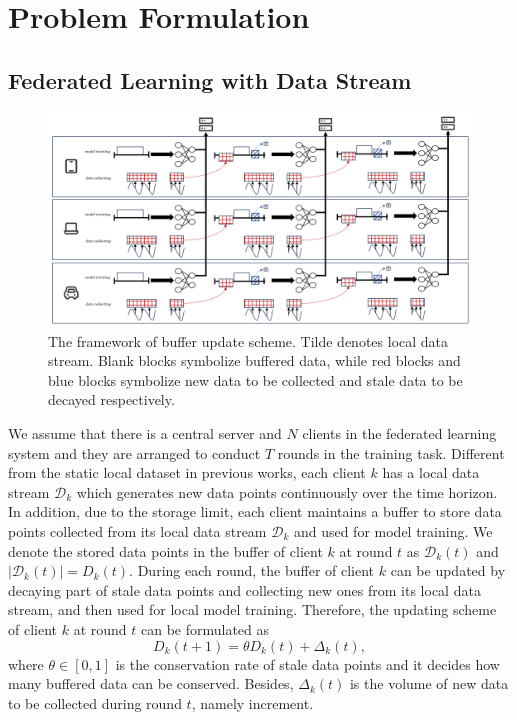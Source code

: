 \documentclass{article}
\theoremstyle{plain}
\theoremstyle{definition}
\theoremstyle{remark}
\begin{document}
\section{Problem Formulation}
\subsection{Federated Learning with Data Stream}
\begin{figure}[ht]
  \centering
  \includegraphics[width=\columnwidth]{figures/figure_21.png}
  \caption{The framework of buffer update scheme. Tilde denotes local data stream. Blank blocks symbolize buffered data, while red blocks and blue blocks symbolize new data to be collected and stale data to be decayed respectively.}
  \label{fig:framework}
\end{figure}
We assume that there is a central server and $N$ clients in the federated learning system and they are arranged to conduct $T$ rounds in the training task. Different from the static local dataset in previous works, each client $k$ has a local data stream $\mathcal{D}_k$ which generates new data points continuously over the time horizon.
In addition, due to the storage limit, each client maintains a buffer to store data points collected from its local data stream $\mathcal{D}_k$ and used for model training.
We denote the stored data points in the buffer of client $k$ at round $t$ as $\mathcal{D}_k(t)$ and $\vert\mathcal{D}_k(t)\vert = D_k(t)$. 
During each round, the buffer of client $k$ can be updated by decaying part of stale data points and collecting new ones from its local data stream, and then used for local model training.
Therefore, the updating scheme of client $k$ at round $t$ can be formulated as
\begin{equation}
  D_k(t+1) = \theta D_k(t) + \Delta_k(t),
  \label{formulation:update}
\end{equation}
where $\theta \in [0,1]$ is the conservation rate of stale data points and it decides how many buffered data can be conserved. 
Besides, $\Delta_k(t)$ is the volume of new data to be collected during round $t$, namely increment. 
\end{document}
